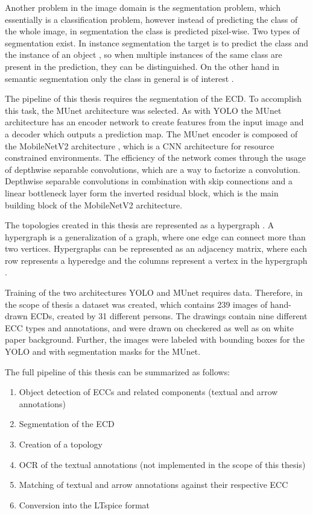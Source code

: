 Another problem in the image domain is the segmentation problem, which essentially is a classification problem, however instead of predicting the class of the whole image, in segmentation the class is predicted pixel-wise.
Two types of segmentation exist.
In instance segmentation the target is to predict the class and the instance of an object \cite{mask_rcnn}, so when multiple instances of the same class are present in the prediction, they can be distinguished.
On the other hand in semantic segmentation only the class in general is of interest \cite{semantic_segmentation}.

The pipeline of this thesis requires the segmentation of the \ac{ECD}.
To accomplish this task, the \acf{MUnet} architecture \cite{mobile_unet} was selected.
As with \ac{YOLO} the \ac{MUnet} architecture has an encoder network to create features from the input image and a decoder which outputs a prediction map.
The \ac{MUnet} encoder is composed of the MobileNetV2 architecture \cite{mnetv2}, which is a \ac{CNN} architecture for resource constrained environments.
The efficiency of the network comes through the usage of depthwise separable convolutions, which are a way to factorize a convolution.
Depthwise separable convolutions in combination with skip connections and a linear bottleneck layer form the inverted residual block, which is the main building block of the MobileNetV2 architecture.

The topologies created in this thesis are represented as a hypergraph \cite{hypergraph_def}.
A hypergraph is a generalization of a graph, where one edge can connect more than two vertices.
Hypergraphs can be represented as an adjacency matrix, where each row represents a hyperedge and the columns represent a vertex in the hypergraph \cite{hypergraph_adjacency}.

Training of the two architectures \ac{YOLO} and \ac{MUnet} requires data.
Therefore, in the scope of thesis a dataset was created, which contains 239 images of hand-drawn \acp{ECD}, created by 31 different persons.
The drawings contain nine different \ac{ECC} types and annotations, and were drawn on checkered as well as on white paper background.
Further, the images were labeled with bounding boxes for the \ac{YOLO} and with segmentation masks for the \ac{MUnet}.

The full pipeline of this thesis can be summarized as follows:

\begin{enumerate}
    \item Object detection of \acp{ECC} and related components (textual and arrow annotations)
    \item Segmentation of the \ac{ECD}
    \item Creation of a topology
    \item \ac{OCR} of the textual annotations (not implemented in the scope of this thesis)
    \item Matching of textual and arrow annotations against their respective \ac{ECC}
    \item Conversion into the LTspice format
\end{enumerate}

